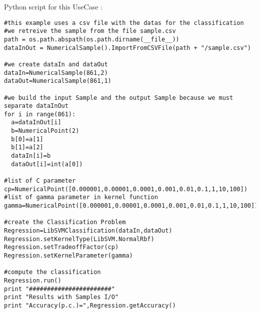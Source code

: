 Python script for this UseCase :
\begin{lstlisting}
#this example uses a csv file with the datas for the classification
#we retreive the sample from the file sample.csv
path = os.path.abspath(os.path.dirname(__file__))
dataInOut = NumericalSample().ImportFromCSVFile(path + "/sample.csv")

#we create dataIn and dataOut
dataIn=NumericalSample(861,2)
dataOut=NumericalSample(861,1)

#we build the input Sample and the output Sample because we must separate dataInOut
for i in range(861):
  a=dataInOut[i]
  b=NumericalPoint(2)
  b[0]=a[1]
  b[1]=a[2]
  dataIn[i]=b
  dataOut[i]=int(a[0])

#list of C parameter 
cp=NumericalPoint([0.000001,0.00001,0.0001,0.001,0.01,0.1,1,10,100])
#list of gamma parameter in kernel function
gamma=NumericalPoint([0.000001,0.00001,0.0001,0.001,0.01,0.1,1,10,100])

#create the Classification Problem 
Regression=LibSVMClassification(dataIn,dataOut)
Regression.setKernelType(LibSVM.NormalRbf)
Regression.setTradeoffFactor(cp)
Regression.setKernelParameter(gamma) 

#compute the classification
Regression.run()
print "#######################"
print "Results with Samples I/O"
print "Accuracy(p.c.)=",Regression.getAccuracy()  
\end{lstlisting}








